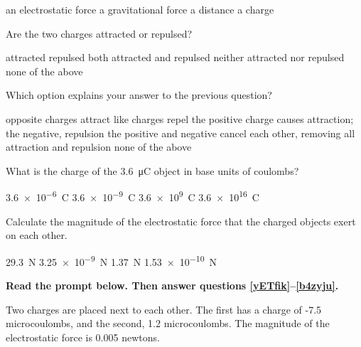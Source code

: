 \documentclass{exam}
\begin{document}
\begin{questions}
\begin{randomizechoices}
    \correctchoice an electrostatic force
    \choice a gravitational force
    \choice a distance
    \choice a charge
\end{randomizechoices}

\question
Are the two charges attracted or repulsed?

\begin{randomizechoices}[keeplast]
    \choice attracted
    \correctchoice repulsed
    \choice both attracted and repulsed
    \choice neither attracted nor repulsed
    \choice none of the above
\end{randomizechoices}

\question
Which option explains your answer to the previous question?

\begin{randomizechoices}[keeplast]
    \choice opposite charges attract
    \correctchoice like charges repel
    \choice the positive charge causes attraction; the negative, repulsion
    \choice the positive and negative cancel each other, removing all attraction and repulsion
    \choice none of the above
\end{randomizechoices}

\question
What is the charge of the \qty{3.6}{\micro C} object in base units of coulombs?

\begin{randomizechoices}
    \correctchoice \qty{3.6e-6}{C}
    \choice \qty{3.6e-9}{C}
    \choice \qty{3.6e9}{C}
    \choice \qty{3.6e16}{C}
\end{randomizechoices}

\question \label{Fxl8ta}
Calculate the magnitude of the electrostatic force that the charged objects exert on each other.

\begin{randomizechoices}
    \correctchoice \qty{29.3}{N}
    \choice \qty{3.25e-9}{N}
    \choice \qty{1.37}{N}
    \choice \qty{1.53e-10}{N}
\end{randomizechoices}
\vspace{1em}
\cyanhrule

\clearpage
\begin{EnvUplevel}
     \textbf{Read the prompt below. Then answer questions \ref{yETfik}--\ref{b4zyju}.}

    Two charges are placed next to each other. The first has a charge of -7.5 microcoulombs, and the second, 1.2 microcoulombs. The magnitude of the electrostatic force is 0.005 newtons.  
\end{EnvUplevel}





\end{questions}
\end{document}
